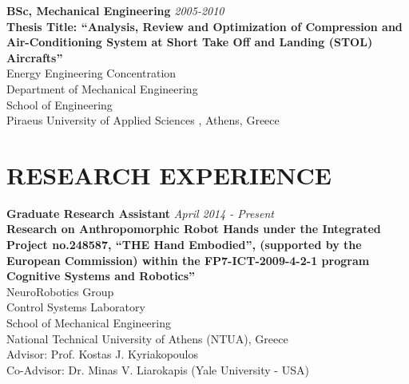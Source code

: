 \documentclass[11pt]{res} %
\begin{document}
\begin{resume}
\small\textbf{BSc, Mechanical Engineering} \hfill {\sl 2005-2010}  \\
\small\textbf{Thesis Title: ``Analysis, Review and Optimization of Compression and Air-Conditioning System at Short Take Off and Landing (STOL) Aircrafts''}\\
Energy Engineering Concentration\\%
Department of Mechanical Engineering%
\\%
School of Engineering%
\\%
Piraeus University of Applied Sciences%
, Athens, Greece 
 
\vspace{0.2in} %






\section{RESEARCH EXPERIENCE}

\vspace{8pt} %

\small\textbf{Graduate Research Assistant} \hfill {\sl April 2014 - Present} \\\small\textbf{Research on Anthropomorphic Robot Hands under the Integrated Project no.248587,%
``THE Hand Embodied'', (supported by the
European Commission) within the FP7-ICT-2009-4-2-1 program Cognitive Systems and
Robotics”}\\%
NeuroRobotics Group%
\\Control Systems Laboratory\\School of Mechanical Engineering\\National Technical University of Athens (NTUA), Greece\\Advisor: Prof. Kostas J. Kyriakopoulos\\Co-Advisor: Dr. Minas V. Liarokapis (Yale University - USA)
 

\end{resume}
\end{document}
